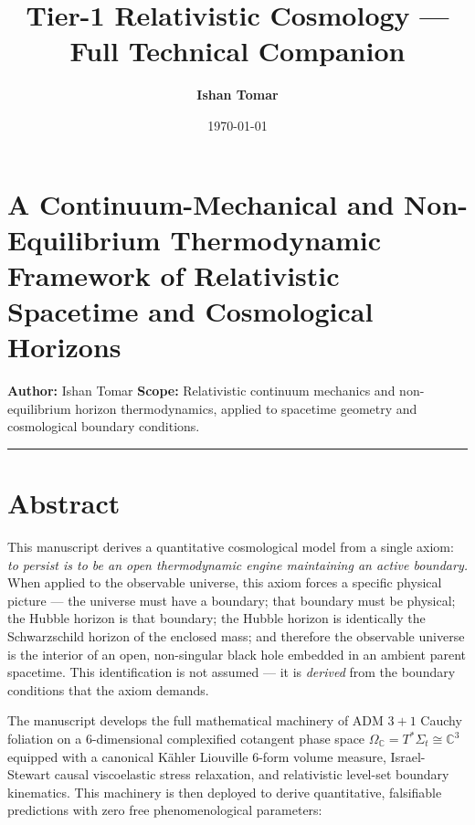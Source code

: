 \documentclass[11pt,a4paper]{article}
\title{\textbf{Tier-1 Relativistic Cosmology — Full Technical Companion}}\author{\textbf{Ishan Tomar}}\date{\today}
\theoremstyle{definition}\newtheorem{definition}{Definition}
\theoremstyle{remark}\newtheorem{remark}{Remark}
\begin{document}
\maketitle\tableofcontents\newpage


\section*{A Continuum-Mechanical and Non-Equilibrium Thermodynamic Framework of Relativistic Spacetime and Cosmological Horizons}

\textbf{Author:} Ishan Tomar
\textbf{Scope:} Relativistic continuum mechanics and non-equilibrium horizon thermodynamics, applied to spacetime geometry and cosmological boundary conditions.

\noindent\rule{\linewidth}{0.4pt}
\section{Abstract}

This manuscript derives a quantitative cosmological model from a single axiom: \textit{to persist is to be an open thermodynamic engine maintaining an active boundary.} When applied to the observable universe, this axiom forces a specific physical picture — the universe must have a boundary; that boundary must be physical; the Hubble horizon is that boundary; the Hubble horizon is identically the Schwarzschild horizon of the enclosed mass; and therefore the observable universe is the interior of an open, non-singular black hole embedded in an ambient parent spacetime. This identification is not assumed — it is \textit{derived} from the boundary conditions that the axiom demands.

The manuscript develops the full mathematical machinery of ADM $3+1$ Cauchy foliation on a 6-dimensional complexified cotangent phase space $\Omega_{\mathbb{C}} = T^*\Sigma_t \cong \mathbb{C}^3$ equipped with a canonical Kähler Liouville 6-form volume measure, Israel-Stewart causal viscoelastic stress relaxation, and relativistic level-set boundary kinematics. This machinery is then deployed to derive quantitative, falsifiable predictions with zero free phenomenological parameters:
\end{document}

